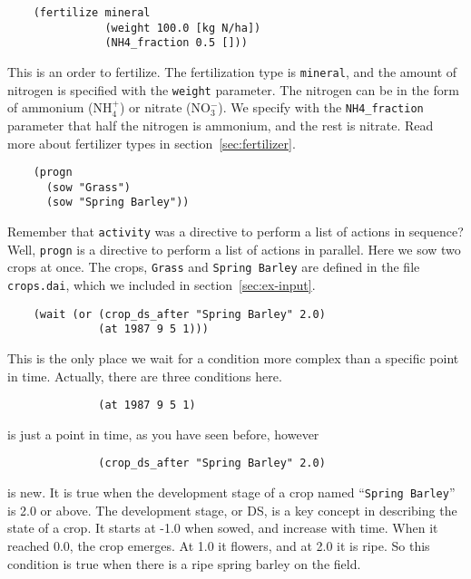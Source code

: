 \documentclass[a4paper,11pt]{article}
\begin{document}
\begin{verbatim}
    (fertilize mineral
               (weight 100.0 [kg N/ha])
               (NH4_fraction 0.5 []))
\end{verbatim}

This is an order to fertilize.  The fertilization type is
\texttt{mineral}, and the amount of nitrogen is specified with the
\texttt{weight} parameter.  The nitrogen can be in the form of
ammonium (NH$_4^+$) or nitrate (NO$_3^-$).  We specify with the
\texttt{NH4\_fraction } parameter that half the nitrogen is ammonium,
and the rest is nitrate.  Read more about fertilizer types in
section~\ref{sec:fertilizer}.

\begin{verbatim}
    (progn
      (sow "Grass")
      (sow "Spring Barley"))
\end{verbatim}

Remember that \texttt{activity} was a directive to perform a list of
actions in sequence?  Well, \texttt{progn} is a directive to perform a
list of actions in parallel.  Here we sow two crops at once.  The
crops, \texttt{Grass} and \texttt{Spring Barley} are defined in the
file \texttt{crops.dai}, which we included in
section~\ref{sec:ex-input}.

\begin{verbatim}
    (wait (or (crop_ds_after "Spring Barley" 2.0)
              (at 1987 9 5 1)))
\end{verbatim}

This is the only place we wait for a condition more complex than a
specific point in time.  Actually, there are three conditions here.

\begin{verbatim}
              (at 1987 9 5 1)
\end{verbatim}

is just a point in time, as you have seen before, however

\begin{verbatim}
              (crop_ds_after "Spring Barley" 2.0)
\end{verbatim}

is new.  It is true when the development stage of a crop named
``\texttt{Spring Barley}'' is 2.0 or above.  The development stage, or
DS, is a key concept in describing the state of a crop.  It starts at
-1.0 when sowed, and increase with time.  When it reached 0.0, the
crop emerges.  At 1.0 it flowers, and at 2.0 it is ripe.   So this
condition is true when there is a ripe spring barley on the field.
\end{document}
